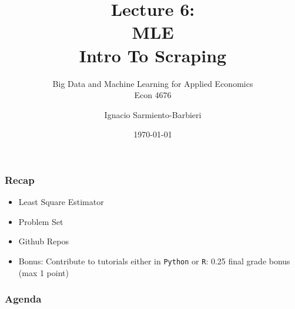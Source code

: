 \documentclass[
  shownotes,
  xcolor={svgnames},
  hyperref={colorlinks,citecolor=DarkBlue,linkcolor=DarkRed,urlcolor=DarkBlue}
  , aspectratio=169]{beamer}
\begin{document}
\title[Lecture 6]{Lecture 6: \\ MLE \\ Intro To Scraping}
\subtitle{Big Data and Machine Learning for Applied Economics \\ Econ 4676}
\date{\today}

\author[Sarmiento-Barbieri]{Ignacio Sarmiento-Barbieri}


\begin{frame}[noframenumbering]
\maketitle
\end{frame}




\begin{frame}
\frametitle{Recap}

\begin{itemize} 
  
    \item Least Square Estimator
    \medskip
    \item Problem Set    
    \medskip
    \item Github Repos
    \medskip
    \item Bonus: Contribute to tutorials either in  \texttt{Python}  or \texttt{R}:  0.25 final grade bonus (max 1 point)

\end{itemize}

\end{frame}


\begin{frame}
\frametitle{Agenda}

\tableofcontents


\end{frame}



\end{document}
